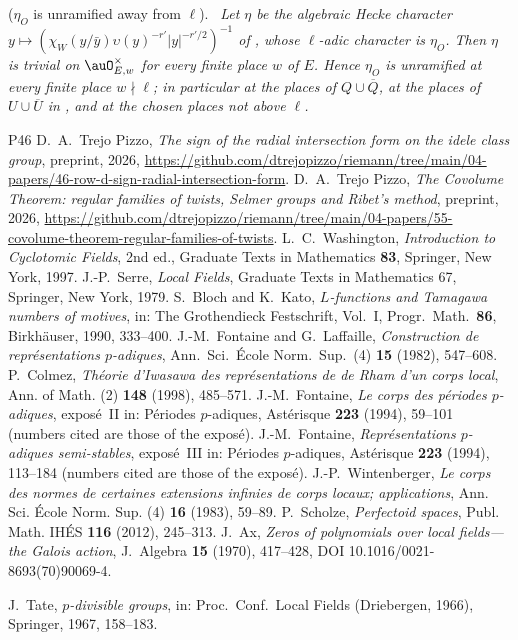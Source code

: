 \documentclass[10pt]{amsart}
\theoremstyle{definition}
\theoremstyle{remark}
\newenvironment{quotedthm}[2]{\par\medskip\noindent\begingroup
  \textbf{#1}#2.\ \itshape\ignorespaces}{\endgroup\par\medskip}
\begin{document}
\begin{quotedthm}{\cite[Lemma~8.27]{P55}}{ ($\eta_O$ is unramified away from $\ell$)}
Let $\eta$ be the algebraic Hecke character $y\mapsto(\chi_W(y/\bar y)\allowbreak \upsilon(y)^{-r'}\allowbreak |y|^{-r'/2})^{-1}$
of {\cite[Proposition~6.11]{P55}}, whose $\ell$-adic character is $\eta_O$. Then $\eta$ is trivial on
$\auO_{E,w}^\times$ for every finite place $w$ of $E$. Hence $\eta_O$ is unramified at every finite
place $w\nmid\ell$; in particular at the places of $Q\cup\overline Q$, at the places of $U\cup
\overline U$ in {\cite[Proposition~4.6(c)]{P55}}, and at the chosen places not above $\ell$.
\end{quotedthm}

\begin{thebibliography}{P46}
 D.~A.~Trejo Pizzo, \emph{The sign of the radial intersection form on the idele class group}, preprint, 2026, \url{https://github.com/dtrejopizzo/riemann/tree/main/04-papers/46-row-d-sign-radial-intersection-form}.
 D.~A.~Trejo Pizzo, \emph{The Covolume Theorem: regular families of twists, Selmer groups and Ribet's method}, preprint, 2026, \url{https://github.com/dtrejopizzo/riemann/tree/main/04-papers/55-covolume-theorem-regular-families-of-twists}.
 L.~C.~Washington, \emph{Introduction to Cyclotomic Fields}, 2nd ed.,
Graduate Texts in Mathematics \textbf{83}, Springer, New York, 1997.
 J.-P.~Serre, \emph{Local Fields}, Graduate Texts in Mathematics 67, Springer,
New York, 1979.
 S.~Bloch and K.~Kato, \emph{$L$-functions and Tamagawa numbers of motives},
in: The Grothendieck Festschrift, Vol.~I, Progr.\ Math.\ \textbf{86}, Birkh\"auser, 1990,
333--400.
 J.-M.~Fontaine and G.~Laffaille, \emph{Construction de
repr\'esentations $p$-adiques}, Ann.\ Sci.\ \'Ecole Norm.\ Sup.\ (4) \textbf{15} (1982), 547--608.
 P.~Colmez, \emph{Th\'eorie d'Iwasawa des repr\'esentations de de Rham d'un corps local}, Ann. of Math. (2) \textbf{148} (1998), 485--571.
 J.-M.~Fontaine, \emph{Le corps des p\'eriodes $p$-adiques}, expos\'e~II in: P\'eriodes $p$-adiques, Ast\'erisque \textbf{223} (1994), 59--101 (numbers cited are those of the expos\'e).
 J.-M.~Fontaine, \emph{Repr\'esentations $p$-adiques semi-stables}, expos\'e~III in: P\'eriodes $p$-adiques, Ast\'erisque \textbf{223} (1994), 113--184 (numbers cited are those of the expos\'e).
 J.-P.~Wintenberger, \emph{Le corps des normes de certaines extensions infinies de corps locaux; applications}, Ann. Sci. \'Ecole Norm. Sup. (4) \textbf{16} (1983), 59--89.
 P.~Scholze, \emph{Perfectoid spaces}, Publ. Math. IH\'ES \textbf{116} (2012), 245--313.
 J.~Ax, \emph{Zeros of polynomials over local fields---the Galois action},
J.\ Algebra \textbf{15} (1970), 417--428, DOI 10.1016/0021-8693(70)90069-4.

 J.~Tate, \emph{$p$-divisible groups}, in: Proc.\ Conf.\ Local Fields (Driebergen, 1966), Springer, 1967, 158--183.








\end{thebibliography}
\end{document}
